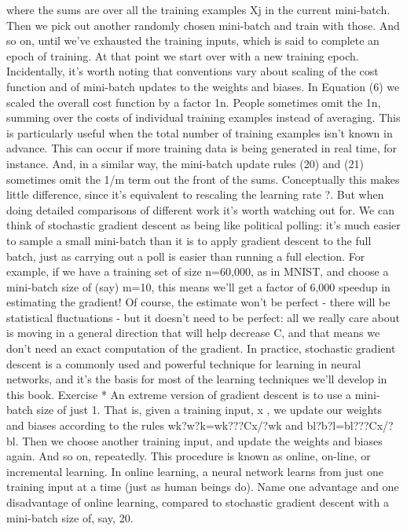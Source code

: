 where the sums are over all the training examples Xj in the current mini-batch. Then we pick out another randomly chosen mini-batch and train with those. And so on, until we've exhausted the training inputs, which is said to complete an epoch of training. At that point we start over with a new training epoch.
Incidentally, it's worth noting that conventions vary about scaling of the cost function and of mini-batch updates to the weights and biases. In Equation (6) we scaled the overall cost function by a factor 1n. People sometimes omit the 1n, summing over the costs of individual training examples instead of averaging. This is particularly useful when the total number of training examples isn't known in advance. This can occur if more training data is being generated in real time, for instance. And, in a similar way, the mini-batch update rules (20) and (21) sometimes omit the 1/m term out the front of the sums. Conceptually this makes little difference, since it's equivalent to rescaling the learning rate ?. But when doing detailed comparisons of different work it's worth watching out for.
We can think of stochastic gradient descent as being like political polling: it's much easier to sample a small mini-batch than it is to apply gradient descent to the full batch, just as carrying out a poll is easier than running a full election. For example, if we have a training set of size n=60,000, as in MNIST, and choose a mini-batch size of (say) m=10, this means we'll get a factor of 6,000 speedup in estimating the gradient! Of course, the estimate won't be perfect - there will be statistical fluctuations - but it doesn't need to be perfect: all we really care about is moving in a general direction that will help decrease C, and that means we don't need an exact computation of the gradient. In practice, stochastic gradient descent is a commonly used and powerful technique for learning in neural networks, and it's the basis for most of the learning techniques we'll develop in this book.
Exercise
* An extreme version of gradient descent is to use a mini-batch size of just 1. That is, given a training input, x , we update our weights and biases according to the rules wk?w?k=wk???Cx/?wk and bl?b?l=bl???Cx/?bl. Then we choose another training input, and update the weights and biases again. And so on, repeatedly. This procedure is known as online, on-line, or incremental learning. In online learning, a neural network learns from just one training input at a time (just as human beings do). Name one advantage and one disadvantage of online learning, compared to stochastic gradient descent with a mini-batch size of, say, 20. 
